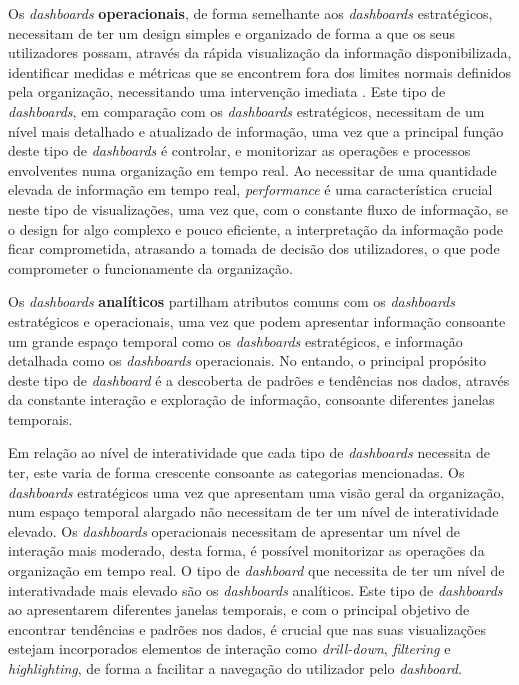 Os \textit{dashboards} \textbf{operacionais}, de forma semelhante aos \textit{dashboards} estratégicos, necessitam de ter um design simples e organizado de forma a que os seus utilizadores possam, através da rápida visualização da informação disponibilizada, identificar medidas e métricas que se encontrem fora dos limites normais definidos pela organização, necessitando uma intervenção imediata \cite{pappas2011riding}. Este tipo de \textit{dashboards}, em comparação com os \textit{dashboards} estratégicos, necessitam de um nível mais detalhado e atualizado de informação, uma vez que a principal função deste tipo de \textit{dashboards} é controlar, e monitorizar as operações e processos envolventes numa organização em tempo real. Ao necessitar de uma quantidade elevada de informação em tempo real, \textit{performance} é uma característica crucial neste tipo de visualizações, uma vez que, com o constante fluxo de informação, se o design for algo complexo e pouco eficiente, a interpretação da informação pode ficar comprometida, atrasando a tomada de decisão dos utilizadores, o que pode comprometer o funcionamente da organização.

Os \textit{dashboards} \textbf{analíticos} partilham atributos comuns com os \textit{dashboards} estratégicos e operacionais, uma vez que podem apresentar informação consoante um grande espaço temporal como os \textit{dashboards} estratégicos, e informação detalhada como os \textit{dashboards} operacionais. No entando, o principal propósito deste tipo de \textit{dashboard} é a descoberta de padrões e tendências nos dados, através da constante interação e exploração de informação, consoante diferentes janelas temporais.

Em relação ao nível de interatividade que cada tipo de \textit{dashboards} necessita de ter, este varia de forma crescente consoante as categorias mencionadas. Os \textit{dashboards} estratégicos uma vez que apresentam uma visão geral da organização, num espaço temporal alargado não necessitam de ter um nível de interatividade elevado. Os \textit{dashboards} operacionais necessitam de apresentar um nível de interação mais moderado, desta forma, é possível monitorizar as operações da organização em tempo real. O tipo de \textit{dashboard} que necessita de ter um nível de interativadade mais elevado são os \textit{dashboards} analíticos. Este tipo de \textit{dashboards} ao apresentarem diferentes janelas temporais, e com o principal objetivo de encontrar tendências e padrões nos dados, é crucial que nas suas visualizações estejam incorporados elementos de interação como \textit{drill-down}, \textit{filtering} e \textit{highlighting}, de forma a facilitar a navegação do utilizador pelo \textit{dashboard}.

